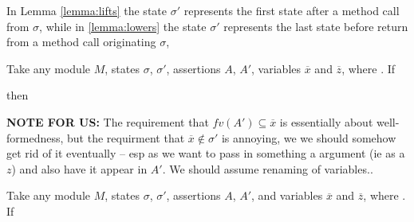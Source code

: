 { 

In Lemma \ref{lemma:lifts} the state $\sigma'$ represents the first state after a method call from  $\sigma$, while in \ref{lemma:lowers} the state $\sigma'$ represents the last state before return from a method call originating  $\sigma$, 

  \begin{lemma}
 \label{lemma:lifts}
Take any  module $M$, states $\sigma$, $\sigma'$, assertions $A$, $A'$,    variables $\overline x$ and $\overline z$, where
.
 If
 
 then
\end{lemma}


{\textbf{NOTE FOR US:} The requirement  that  $fv(A') \subseteq \overline x$  is essentially about well-formedness,  but the requirment that $ \overline x \notin \sigma'$ is annoying, we we should somehow get rid of it eventually -- esp as we want to pass in something a argument (ie as a $z$) and also have it appear in $A'$. We should assume renaming of variables..}

 
  \begin{lemma}
 \label{lemma:lowers}
Take any  module $M$, states $\sigma$, $\sigma'$, assertions $A$, $A'$,  
  and variables $\overline x$ and $\overline z$, where
. If 


\end{lemma}}
